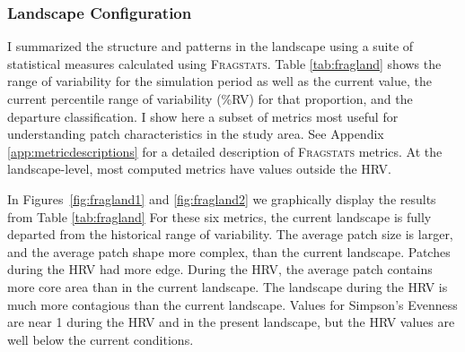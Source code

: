 \clearpage



\subsubsection{Landscape Configuration}
I summarized the structure and patterns in the landscape using a suite of statistical measures calculated using \textsc{Fragstats}. Table \ref{tab:fragland} shows the range of variability for the simulation period as well as the current value, the current percentile range of variability (\%RV) for that proportion, and the departure classification. I show here a subset of metrics most useful for understanding patch characteristics in the study area. See Appendix \ref{app:metricdescriptions} for a detailed description of \textsc{Fragstats} metrics. At the landscape-level, most computed metrics have values outside the HRV. 

In Figures~\ref{fig:fragland1} and \ref{fig:fragland2} we graphically display the results from Table \ref{tab:fragland} For these six metrics, the current landscape is fully departed from the historical range of variability. The average patch size is larger, and the average patch shape more complex, than the current landscape. Patches during the HRV had more edge. During the HRV, the average patch contains more core area than in the current landscape. The landscape during the HRV is much more contagious than the current landscape. Values for Simpson's Evenness are near 1 during the HRV and in the present landscape, but the HRV values are well below the current conditions.


